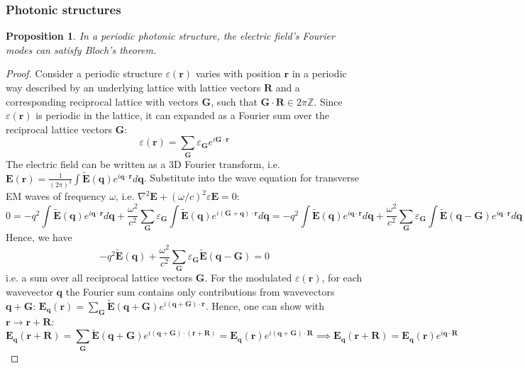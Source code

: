 \documentclass[a4paper]{article}
\theoremstyle{new}
\newtheorem{prop}{Proposition}[section]
\begin{document}
\subsubsection*{Photonic structures}
\begin{prop}
In a periodic photonic structure, the electric field's Fourier modes can satisfy Bloch's theorem.
\end{prop}
\begin{proof}
Consider a periodic structure $\varepsilon(\mathbf{r})$ varies with position $\mathbf{r}$ in a periodic way described by an underlying lattice with lattice vectors $\mathbf{R}$ and a corresponding reciprocal lattice with vectors $\mathbf{G}$, such that $\mathbf{G}\cdot\mathbf{R}\in2\pi\mathbb{Z}$. Since $\varepsilon(\mathbf{r})$ is periodic in the lattice, it can expanded as a Fourier sum over the reciprocal lattice vectors $\mathbf{G}$:
$$\varepsilon(\mathbf{r})=\sum_{\mathbf{G}}\varepsilon_{\mathbf{G}}e^{i\mathbf{G}\cdot\mathbf{r}}$$
The electric field can be written as a 3D Fourier transform, i.e. $\mathbf{E}(\mathbf{r})=\frac{1}{(2\pi)^3}\int\mathbf{\tilde{E}}(\mathbf{q})e^{i\mathbf{q}\cdot\mathbf{r}}d\mathbf{q}$. Substitute into the wave equation for transverse EM waves of frequency $\omega$, i.e. $\nabla^2\mathbf{E}+(\omega/c)^2\varepsilon\mathbf{E}=0$:
$$0=-q^2\int\mathbf{\tilde{E}}(\mathbf{q})e^{i\mathbf{q}\cdot\mathbf{r}}d\mathbf{q}+\frac{\omega^2}{c^2}\sum_{\mathbf{G}}\varepsilon_{\mathbf{G}}\int\mathbf{\tilde{E}}(\mathbf{q})e^{i(\mathbf{G}+\mathbf{q})\cdot\mathbf{r}}d\mathbf{q}=-q^2\int\mathbf{\tilde{E}}(\mathbf{q})e^{i\mathbf{q}\cdot\mathbf{r}}d\mathbf{q}+\frac{\omega^2}{c^2}\sum_{\mathbf{G}}\varepsilon_{\mathbf{G}}\int\mathbf{\tilde{E}}(\mathbf{q}-\mathbf{G})e^{i\mathbf{q}\cdot\mathbf{r}}d\mathbf{q}$$
Hence, we have
$$-q^2\mathbf{\tilde{E}}(\mathbf{q})+\frac{\omega^2}{c^2}\sum_{\mathbf{G}}\varepsilon_{\mathbf{G}}\mathbf{\tilde{E}}(\mathbf{q}-\mathbf{G})=0$$
i.e. a sum over all reciprocal lattice vectors $\mathbf{G}$. For the modulated $\varepsilon(\mathbf{r})$, for each wavevector $\mathbf{q}$ the Fourier sum contains only contributions from wavevectors $\mathbf{q}+\mathbf{G}$: $\mathbf{E}_{\mathbf{q}}(\mathbf{r})=\sum_{\mathbf{G}}\mathbf{\tilde{E}}(\mathbf{q}+\mathbf{G})e^{i(\mathbf{q}+\mathbf{G})\cdot\mathbf{r}}$. Hence, one can show with $\mathbf{r}\rightarrow\mathbf{r}+\mathbf{R}$:
$$\mathbf{E}_{\mathbf{q}}(\mathbf{r}+\mathbf{R})=\sum_{\mathbf{G}}\mathbf{\tilde{E}}(\mathbf{q}+\mathbf{G})e^{i(\mathbf{q}+\mathbf{G})\cdot(\mathbf{r}+\mathbf{R})}=\mathbf{E}_{\mathbf{q}}(\mathbf{r})e^{i(\mathbf{q}+\mathbf{G})\cdot\mathbf{R}}\implies \mathbf{E}_{\mathbf{q}}(\mathbf{r}+\mathbf{R})=\mathbf{E}_{\mathbf{q}}(\mathbf{r})e^{i\mathbf{q}\cdot\mathbf{R}}$$
\end{proof}
\end{document}
